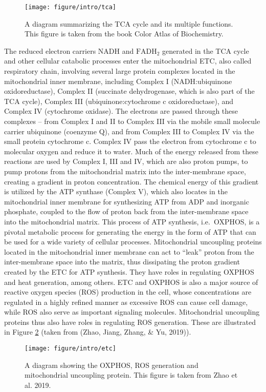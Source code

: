 \documentclass[12pt,twoside,openany,\mydriver]{thesis}  %
\begin{document}
\begin{figure}
\texttt{[image: figure/intro/tca]} \caption{A diagram summarizing the TCA cycle and its multiple functions. This figure is taken from the book Color Atlas of Biochemistry.}\label{fig:intro-tca}
\end{figure}
The reduced electron carriers NADH and \(\mathrm{FADH_2}\) generated in the TCA cycle and other cellular catabolic processes enter the mitochondrial ETC, also called respiratory chain, involving several large protein complexes located in the mitochondrial inner membrane, including Complex I (NADH:ubiquinone oxidoreductase), Complex II (succinate dehydrogenase, which is also part of the TCA cycle), Complex III (ubiquinone:cytochrome c oxidoreductase), and Complex IV (cytochrome oxidase). The electrons are passed through these complexes -- from Complex I and II to Complex III via the mobile small molecule carrier ubiquinone (coenzyme Q), and from Complex III to Complex IV via the small protein cytochrome c. Complex IV pass the electron from cytochrome c to molecular oxygen and reduce it to water. Much of the energy released from these reactions are used by Complex I, III and IV, which are also proton pumps, to pump protons from the mitochondrial matrix into the inter-membrane space, creating a gradient in proton concentration. The chemical energy of this gradient is utilized by the ATP synthase (Complex V), which also locates in the mitochondrial inner membrane for synthesizing ATP from ADP and inorganic phosphate, coupled to the flow of proton back from the inter-membrane space into the mitochondrial matrix. This process of ATP synthesis, i.e.~OXPHOS, is a pivotal metabolic process for generating the energy in the form of ATP that can be used for a wide variety of cellular processes. Mitochondrial uncoupling proteins located in the mitochondrial inner membrane can act to ``leak'' proton from the inter-membrane space into the matrix, thus dissipating the proton gradient created by the ETC for ATP synthesis. They have roles in regulating OXPHOS and heat generation, among others. ETC and OXPHOS is also a major source of reactive oxygen species (ROS) production in the cell, whose concentrations are regulated in a highly refined manner as excessive ROS can cause cell damage, while ROS also serve as important signaling molecules. Mitochondrial uncoupling proteins thus also have roles in regulating ROS generation. These are illustrated in Figure \ref{fig:intro-etc} (taken from (Zhao, Jiang, Zhang, \& Yu, 2019)).
\begin{figure}
\texttt{[image: figure/intro/etc]} \caption{A diagram showing the OXPHOS, ROS generation and mitochondrial uncoupling protein. This figure is taken from Zhao et al. 2019.}\label{fig:intro-etc}
\end{figure}
\end{document}
